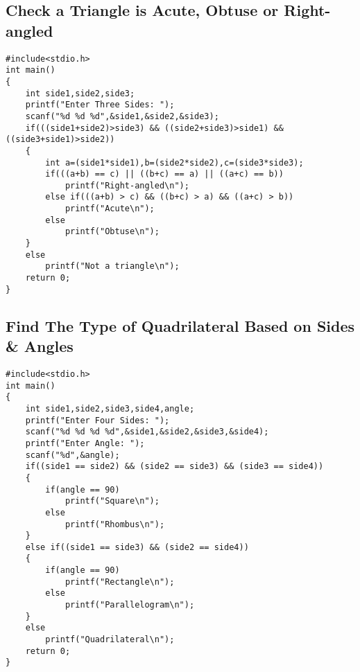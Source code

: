\documentclass[a4paper,14pt]{article}
\begin{document}
\subsection{Check a Triangle is Acute, Obtuse or Right-angled}
\vspace{0.5cm}
\begin{lstlisting}[caption={Check a Triangle is Acute, Obtuse or Right-angled}]
#include<stdio.h>
int main()
{
    int side1,side2,side3;
    printf("Enter Three Sides: ");
    scanf("%d %d %d",&side1,&side2,&side3);
    if(((side1+side2)>side3) && ((side2+side3)>side1) && ((side3+side1)>side2))
    {
        int a=(side1*side1),b=(side2*side2),c=(side3*side3);
        if(((a+b) == c) || ((b+c) == a) || ((a+c) == b))
            printf("Right-angled\n");
        else if(((a+b) > c) && ((b+c) > a) && ((a+c) > b))
            printf("Acute\n");
        else
            printf("Obtuse\n");
    }
    else
        printf("Not a triangle\n");
    return 0;
}
\end{lstlisting}
\newpage

\subsection{Find The Type of Quadrilateral Based on Sides & Angles}
\vspace{0.5cm}
\begin{lstlisting}[caption={Find The Type of Quadrilateral Based on Sides & Angles}]
#include<stdio.h>
int main()
{
    int side1,side2,side3,side4,angle;
    printf("Enter Four Sides: ");
    scanf("%d %d %d %d",&side1,&side2,&side3,&side4);
    printf("Enter Angle: ");
    scanf("%d",&angle);
    if((side1 == side2) && (side2 == side3) && (side3 == side4))
    {
        if(angle == 90)
            printf("Square\n");
        else
            printf("Rhombus\n");
    }
    else if((side1 == side3) && (side2 == side4))
    {
        if(angle == 90)
            printf("Rectangle\n");
        else
            printf("Parallelogram\n");
    }
    else
        printf("Quadrilateral\n");
    return 0;
}
\end{lstlisting}
\newpage
\end{document}
